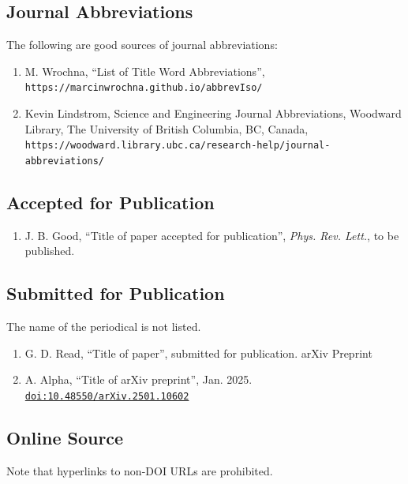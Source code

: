 \documentclass[%
               hyphens,       %
               ]{jacow}
\begin{document}
\subsection{Journal Abbreviations}

The following are good sources of journal abbreviations:
\begin{enumerate}[leftmargin=22pt, resume*]\small
	\item M. Wrochna, “List of Title Word Abbreviations”,
		\nolinkurl{https://marcinwrochna.github.io/abbrevIso/}

	\item  Kevin Lindstrom, Science and Engineering Journal Abbreviations, Woodward Library, 
		The University of British Columbia, BC, Canada, 
		\nolinkurl{https://woodward.library.ubc.ca/research-help/journal-abbreviations/}
\end{enumerate}

\subsection{Accepted for Publication}

\begin{enumerate}[leftmargin=22pt, resume*]
	\item J. B. Good, “Title of paper accepted for publication”, 
		\textit{Phys. Rev. Lett.}, to be published.
\end{enumerate}

\subsection{Submitted for Publication}

The name of the periodical is not listed.

\begin{enumerate}[leftmargin=22pt, resume*]
	\item G. D. Read, “Title of paper”, submitted for publication.
		arXiv Preprint

	\item  A. Alpha, “Title of arXiv preprint”, Jan. 2025. 
		\href{https://doi.org/10.48550/arXiv.2501.10602}{\texttt{doi:10.48550/arXiv.2501.10602}}
\end{enumerate}

\subsection{Online Source}

Note that hyperlinks to non-DOI URLs are prohibited.
\end{document}
